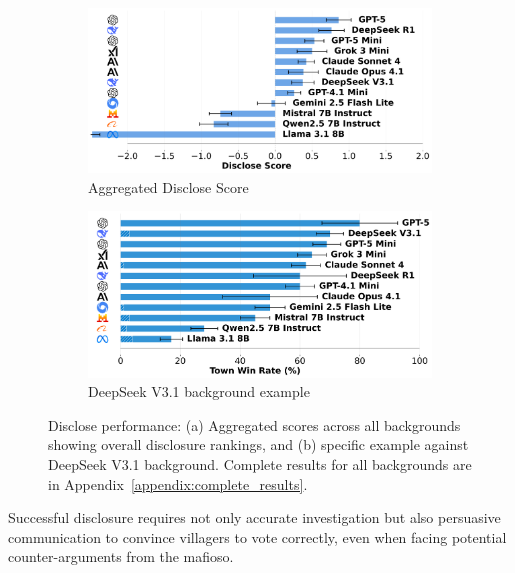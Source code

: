 \documentclass{article}
\begin{document}
\begin{figure}[htbp]
    \centering
    \begin{subfigure}[b]{0.48\textwidth}
        \centering
        \includegraphics[width=\textwidth]{../results/detective_score_benchmark.png}
        \caption{Aggregated Disclose Score}
        \label{fig:disclose_score}
    \end{subfigure}
    \hfill
    \begin{subfigure}[b]{0.48\textwidth}
        \centering
        \includegraphics[width=\textwidth]{../results/detective_deepseek_v3.1_db_benchmark.png}
        \caption{DeepSeek V3.1 background example}
        \label{fig:disclose_deepseek_example}
    \end{subfigure}
    \caption{Disclose performance: (a) Aggregated scores across all backgrounds showing overall disclosure rankings, and (b) specific example against DeepSeek V3.1 background. Complete results for all backgrounds are in Appendix~\ref{appendix:complete_results}.}
    \label{fig:disclose_example}
\end{figure}

Successful disclosure requires not only accurate investigation but also persuasive communication to convince villagers to vote correctly, even when facing potential counter-arguments from the mafioso.
\end{document}
